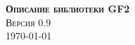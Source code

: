 \documentclass[12pt,a4paper]{book}
\begin{document}
\begin{titlepage}
\vspace*{7cm}
\begin{center}
{\Huge\bf\scshape Описание библиотеки GF2}\\[2ex]
{\large\scshape Версия 0.9}\\[1ex]
{\scshape\today}\\
\end{center}
\end{titlepage}
\clearemptydoublepage
{}
\tableofcontents
\clearemptydoublepage
{}
\end{document}
